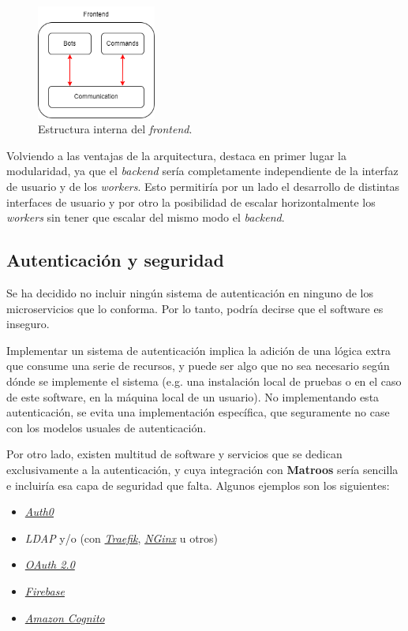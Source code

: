 \begin{figure}[H]
	\centering
	\includegraphics[width=0.35\textwidth]{img/frontend_internals.png}
	\caption{Estructura interna del \textit{frontend}.}
\end{figure}

Volviendo a las ventajas de la arquitectura, destaca en primer lugar la modularidad, ya que el \textit{backend} sería completamente independiente de la interfaz de usuario y de los \textit{workers}. Esto permitiría por un lado el desarrollo de distintas interfaces de usuario y por otro la posibilidad de escalar horizontalmente los \textit{workers} sin tener que escalar del mismo modo el \textit{backend}.


\subsection{Autenticación y seguridad}

Se ha decidido no incluir ningún sistema de autenticación en ninguno de los microservicios que lo conforma. Por lo tanto, podría decirse que el software es inseguro.

Implementar un sistema de autenticación implica la adición de una lógica extra que consume una serie de recursos, y puede ser algo que no sea necesario según dónde se implemente el sistema (e.g. una instalación local de pruebas o en el caso de este software, en la máquina local de un usuario). No implementando esta autenticación, se evita una implementación específica, que seguramente no case con los modelos usuales de autenticación.

Por otro lado, existen multitud de software y servicios que se dedican exclusivamente a la autenticación, y cuya integración con \textbf{Matroos} sería sencilla e incluiría esa capa de seguridad que falta. Algunos ejemplos son los siguientes:

\begin{itemize}
	\item \href{https://auth0.com/es}{\textit{Auth0}}
	\item \textit{LDAP} y/o (con \href{https://doc.traefik.io/traefik/}{\textit{Traefik}}, \href{https://www.nginx.com/}{\textit{NGinx}} u otros)
	\item \href{https://oauth.net/2/}{\textit{OAuth 2.0}}
	\item \href{https://firebase.google.com/?hl=es}{\textit{Firebase}}
	\item \href{https://aws.amazon.com/es/cognito/}{\textit{Amazon Cognito}}
\end{itemize}

